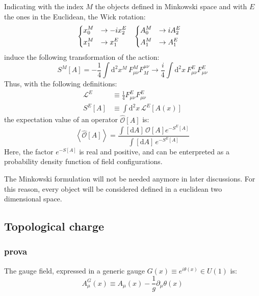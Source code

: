 Indicating with the index $M$ the objects defined in Minkowski space and with $E$ the ones in the Euclidean, the Wick rotation:
\begin{align*}
    &\begin{dcases}
        x_0^M &\rightarrow -i x_2^E \\
        x_1^M &\rightarrow x_1^E
    \end{dcases}%
    &%
    \begin{dcases}
        A^M_0 &\rightarrow i A^E_2 \\
        A^M_1 &\rightarrow A^E_1 
    \end{dcases}&
\end{align*}
induce the following transformation of the action:
\[
    S^M[A] = -\frac{1}{4}\int\mathrm d^2x^M\,F^M_{\mu\nu}F_M^{\mu\nu} \rightarrow  \frac{i}{4}\int\mathrm d^2x\,F^E_{\mu\nu}F^E_{\mu\nu}
\]
Thus, with the following definitions:
\begin{equation}\label{eq:cont_action}
    \begin{aligned}
        \mathcal L^E &\equiv \frac{1}{4}F^E_{\mu\nu}F^E_{\mu\nu} \\
        S^E[A] &\equiv \int\mathrm d^2x\,\mathcal L^E[A(x)]
    \end{aligned}
\end{equation}
the expectation value of an operator $\widehat{\mathcal O}[A]$ is:
\begin{equation}\label{eq:cont_exp}
    \left< \widehat{\mathcal O}[A] \right> = \frac{\int[\mathrm dA]\, \mathcal O[A] e^{-S^E[A]}}{\int[\mathrm dA]\,e^{-S^E[A]}}
\end{equation}
Here, the factor $e^{-S[A]}$ is real and positive, and can be enterpreted as a probability density function of field configurations.

The Minkowski formulation will not be needed anymore in later discussions.
For this reason, every object will be considered defined in a euclidean two dimensional space.

\subsection*{Topological charge}

\subsubsection*{prova}

The gauge field, expressed in a generic gauge $G(x) \equiv e^{i\theta(x)} \in U(1)$ is:
\[
    A^G_\mu(x) \equiv A_\mu(x) - \frac{1}{g}\partial_\mu\theta(x)
\]

